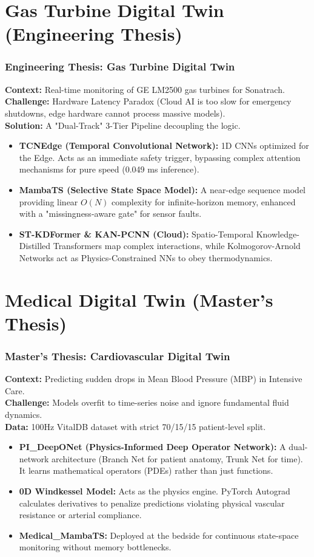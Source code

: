 \documentclass[aspectratio=169]{beamer}
\begin{document}
\section{Gas Turbine Digital Twin (Engineering Thesis)}
\begin{frame}
\frametitle{Engineering Thesis: Gas Turbine Digital Twin}
\textbf{Context:} Real-time monitoring of GE LM2500 gas turbines for Sonatrach. \\
\textbf{Challenge:} Hardware Latency Paradox (Cloud AI is too slow for emergency shutdowns, edge hardware cannot process massive models).\\
\textbf{Solution:} A "Dual-Track" 3-Tier Pipeline decoupling the logic.
\vspace{0.3cm}
\begin{itemize}
    \item \textbf{TCNEdge (Temporal Convolutional Network):} 1D CNNs optimized for the Edge. Acts as an immediate safety trigger, bypassing complex attention mechanisms for pure speed (0.049 ms inference).
    \item \textbf{MambaTS (Selective State Space Model):} A near-edge sequence model providing linear $O(N)$ complexity for infinite-horizon memory, enhanced with a "missingness-aware gate" for sensor faults.
    \item \textbf{ST-KDFormer \& KAN-PCNN (Cloud):} Spatio-Temporal Knowledge-Distilled Transformers map complex interactions, while Kolmogorov-Arnold Networks act as Physics-Constrained NNs to obey thermodynamics.
\end{itemize}
\end{frame}

\section{Medical Digital Twin (Master's Thesis)}
\begin{frame}
\frametitle{Master's Thesis: Cardiovascular Digital Twin}
\textbf{Context:} Predicting sudden drops in Mean Blood Pressure (MBP) in Intensive Care. \\
\textbf{Challenge:} Models overfit to time-series noise and ignore fundamental fluid dynamics.\\
\textbf{Data:} 100Hz VitalDB dataset with strict 70/15/15 patient-level split.
\vspace{0.3cm}
\begin{itemize}
    \item \textbf{PI\_DeepONet (Physics-Informed Deep Operator Network):} A dual-network architecture (Branch Net for patient anatomy, Trunk Net for time). It learns mathematical operators (PDEs) rather than just functions.
    \item \textbf{0D Windkessel Model:} Acts as the physics engine. PyTorch Autograd calculates derivatives to penalize predictions violating physical vascular resistance or arterial compliance.
    \item \textbf{Medical\_MambaTS:} Deployed at the bedside for continuous state-space monitoring without memory bottlenecks.
\end{itemize}
\end{frame}
\end{document}
